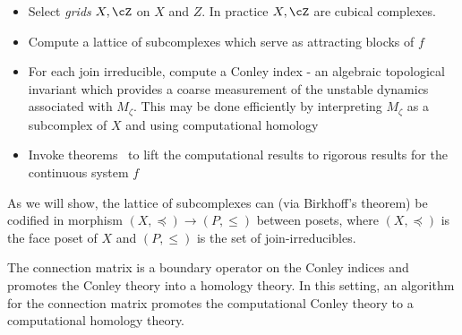 \begin{itemize}
\item Select {\em grids} $X,\cZ$ on $X$ and $Z$.  In practice $X,\cZ$ are cubical complexes.
\item Compute a lattice of subcomplexes which serve as attracting blocks of $f$
\item For each join irreducible, compute a Conley index -  an algebraic topological invariant which provides a coarse measurement of the unstable dynamics associated with $M_\zeta$. This may be done efficiently by interpreting $M_\zeta$ as a subcomplex of $X$ and using computational homology 
\item Invoke theorems~\cite{cmdb,cmdbchaos} to lift the computational results to rigorous results for the continuous system $f$ 

\end{itemize}

As we will show, the lattice of subcomplexes can (via Birkhoff's theorem) be codified in morphism $(X,\preceq)\to (P,\leq)$ between posets, where $(X,\preceq)$ is the face poset of $X$ and $(P,\leq)$ is the set of join-irreducibles.


The connection matrix is a boundary operator on the Conley indices and promotes the Conley theory into a homology theory.  In this setting, an algorithm for the connection matrix promotes the computational Conley theory to a computational homology theory.




